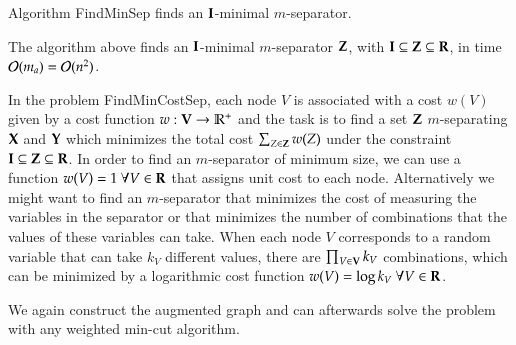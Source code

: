 Algorithm {\sc FindMinSep} finds an $ {\bf I} $-minimal $ m $-separator.

\begin{proposition}
\label{prop:FindMinSep}
The algorithm above finds an ${\bf I}$-minimal $m$-separator ${\bf Z}$, with  ${\bf I}\subseteq{\bf Z}\subseteq{\bf R}$, 
in time ${\cal O}(m_{a}) = {\cal O}(n^2)$.
\end{proposition}


%

%
%
%
 
In the problem {\sc FindMinCostSep}, each node $V$ is associated with a cost $w(V)$ given by a cost function $w: {\bf V} \to \mathbb{R}^+$ and the task is to find a set ${\bf Z}$ $m$-separating ${\bf X}$ and ${\bf Y}$ which minimizes the total cost $\sum_{Z\in{\bf Z}} w(Z)$ under the constraint ${\bf I} \subseteq {\bf Z}\subseteq {\bf R}$. 
In order to find an $m$-separator of minimum size, we can use a function $ w(V) = 1\ \forall V \in {\bf R}$ that assigns unit cost to each node. Alternatively we might want to find an $m$-separator  that minimizes the cost of  measuring the variables in the separator or that minimizes the number of combinations that the values of these variables can take. 
%
When each node $V$ corresponds to a random variable that can take $k_V$ different values, there are $ \prod_{V\in{\bf V}} k_V $ combinations, which can be minimized by a logarithmic cost function $ w(V) = \log k_V\ \forall V \in {\bf R}$. %

We again construct the augmented graph and can afterwards solve the problem with any weighted min-cut algorithm. 


